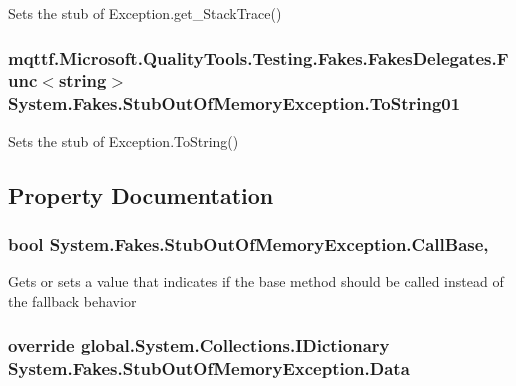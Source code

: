 Sets the stub of Exception.\-get\-\_\-\-Stack\-Trace()

\hypertarget{class_system_1_1_fakes_1_1_stub_out_of_memory_exception_aa42ae12b8cb620a486523bfe43a40d9b}{
\subsubsection[{To\-String01}]{\setlength{\rightskip}{0pt plus 5cm}mqttf.\-Microsoft.\-Quality\-Tools.\-Testing.\-Fakes.\-Fakes\-Delegates.\-Func$<$string$>$ System.\-Fakes.\-Stub\-Out\-Of\-Memory\-Exception.\-To\-String01}}\label{class_system_1_1_fakes_1_1_stub_out_of_memory_exception_aa42ae12b8cb620a486523bfe43a40d9b}


Sets the stub of Exception.\-To\-String()



\subsection{Property Documentation}
\hypertarget{class_system_1_1_fakes_1_1_stub_out_of_memory_exception_a634124746e85ef136b5fb41620138061}{
\subsubsection[{Call\-Base}]{\setlength{\rightskip}{0pt plus 5cm}bool System.\-Fakes.\-Stub\-Out\-Of\-Memory\-Exception.\-Call\-Base\hspace{0.3cm}{\ttfamily [get]}, {\ttfamily [set]}}}\label{class_system_1_1_fakes_1_1_stub_out_of_memory_exception_a634124746e85ef136b5fb41620138061}


Gets or sets a value that indicates if the base method should be called instead of the fallback behavior

\hypertarget{class_system_1_1_fakes_1_1_stub_out_of_memory_exception_ad862f501947faa60e8b30b462700699c}{
\subsubsection[{Data}]{\setlength{\rightskip}{0pt plus 5cm}override global.\-System.\-Collections.\-I\-Dictionary System.\-Fakes.\-Stub\-Out\-Of\-Memory\-Exception.\-Data\hspace{0.3cm}{\ttfamily [get]}}}\label{class_system_1_1_fakes_1_1_stub_out_of_memory_exception_ad862f501947faa60e8b30b462700699c}


